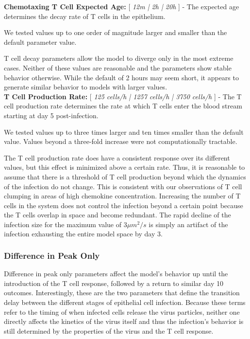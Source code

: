 \documentclass[preprint,10pt,authoryear]{elsarticle}
\begin{document}
\textbf{Chemotaxing T Cell Expected Age:} [ \textit{12m | 2h | 20h} ] - The expected age determines the decay rate of T cells in the epithelium.  

We tested values up to one order of magnitude larger and smaller than the default parameter value.

T cell decay parameters allow the model to diverge only in the most extreme cases.  Neither of these values are reasonable and the parameters show stable behavior otherwise.  While the default of 2 hours may seem short, it appears to generate similar behavior to models with larger values. \\


\textbf{T Cell Production Rate:} [ \textit{125 cells/h | 1257 cells/h | 3750 cells/h} ] - The T cell production rate determines the rate at which T cells enter the blood stream starting at day 5 post-infection.

We tested values up to three times larger and ten times smaller than the default value.  Values beyond a three-fold increase were not computationally tractable.

The T cell production rate does have a consistent response over its different values, but this effect is minimized above a certain rate.  Thus, it is reasonable to assume that there is a threshold of T cell production beyond which the dynamics of the infection do not change.  This is consistent with our observations of T cell clumping in areas of high chemokine concentration.  Increasing the number of T cells in the system does not control the infection beyond a certain point because the T cells overlap in space and become redundant.  The rapid decline of the infection size for the maximum value of $3 \mu m^2/s$ is simply an artifact of the infection exhausting the entire model space by day 3.


\subsubsection{Difference in Peak Only} 

Difference in peak only parameters affect the model's behavior up until the introduction of the T cell response, followed by a return to similar day 10 outcomes.  Interestingly, these are the two parameters that define the transition delay between the different stages of epithelial cell infection. Because these terms refer to the timing of when infected cells release the virus particles, neither one directly affects the kinetics of the virus itself and thus the infection's behavior is still determined by the properties of the virus and the T cell response. \\
\end{document}

